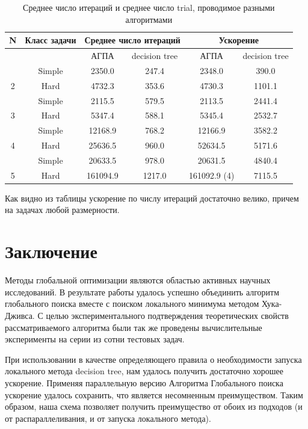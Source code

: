 \documentclass{svproc}
\begin{document}
\begin{table}[h!]
    \caption{Среднее число итераций и среднее число trial, проводимое разными алгоритмами}
    \label{tab:2}
    \centering
    \begin{tabular}{|c|c|c|c|c|c|}
    \hline
	
        N & Класс задачи & \multicolumn{2}{c|}{Среднее число итераций} & \multicolumn{2}{c|}{Ускорение} \\ \hline
          & ~ & АГПА & decision tree & АГПА & decision tree \\ \hline
          & Simple & 2350.0 & 247.4 & 2348.0 & 390.0  \\ \hline
        2  & Hard & 4732.3 & 353.6 & 4730.3 & 1101.1  \\ \hline
          & Simple & 2115.5 & 579.5 & 2113.5 & 2441.4  \\ \hline
        3  & Hard & 5347.4 & 588.1 & 5345.4 & 2532.7  \\ \hline
          & Simple & 12168.9 & 768.2 & 12166.9 & 3582.2  \\ \hline
        4  & Hard & 25636.5 & 960.0 & 52634.5 & 5171.6  \\ \hline
          & Simple & 20633.5 & 978.0 & 20631.5 & 4840.4  \\ \hline
        5  & Hard & 161094.9 & 1217.0 & 161092.9 (4) & 7115.5  \\ \hline
    \end{tabular}
\end{table}

Как видно из таблицы ускорение по числу итераций достаточно велико, причем на задачах любой размерности. 

\section{Заключение}

Методы глобальной оптимизации являются областью активных научных исследований.  В результате работы удалось успешно объединить алгоритм глобального поиска вместе с поиском локального минимума методом Хука-Дживса. С целью экспериментального подтверждения теоретических свойств рассматриваемого алгоритма были так же проведены вычислительные эксперименты на серии из сотни тестовых задач. 

При использовании в качестве определяющего правила о необходимости запуска локального метода decision tree, нам удалось получить достаточно хорошее ускорение. Применяя параллельную версию Алгоритма Глобального поиска ускорение удалось сохранить, что является несомненным преимуществом. Таким образом, наша схема позволяет получить преимущество от обоих из подходов (и от распараллеливания, и от запуска локального метода).
\end{document}
